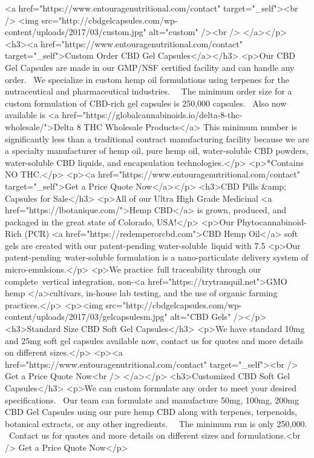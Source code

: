 <a href="https://www.entouragenutritional.com/contact" target="_self"><br />
<img src="http://cbdgelcapsules.com/wp-content/uploads/2017/03/custom.jpg" alt="custom" /><br />
</a></p>
<h3><a href="https://www.entouragenutritional.com/contact" target="_self">Custom Order CBD Gel Capsules</a></h3>
<p>Our CBD Gel Capsules are made in our GMP/NSF certified facility and can handle any order.  We specialize in custom hemp oil formulations using terpenes for the nutraceutical and pharmaceutical industries.   The minimum order size for a custom formulation of CBD-rich gel capsules is 250,000 capsules.  Also now available is <a href="https://globalcannabinoids.io/delta-8-thc-wholesale/">Delta 8 THC Wholesale Products</a> This minimum number is significantly less than a traditional contract manufacturing facility because we are a specialty manufacturer of hemp oil, pure hemp oil, water-soluble CBD powders, water-soluble CBD liquids, and encapsulation technologies.</p>
<p>*Contains NO THC.</p>
<p><a href="https://www.entouragenutritional.com/contact" target="_self">Get a Price Quote Now</a></p>
<h3>CBD Pills &amp; Capsules for Sale</h3>
<p>All of our Ultra High Grade Medicinal <a href="https://lbotanique.com/">Hemp CBD</a> is grown, produced, and packaged in the great state of Colorado, USA!</p>
<p>Our Phytocannabinoid-Rich (PCR) <a href="https://redemperorcbd.com">CBD Hemp Oil</a> soft gels are created with our patent-pending water-soluble liquid with 7.5%
<p>Our patent-pending water-soluble formulation is a nano-particulate delivery system of micro-emulsions.</p>
<p>We practice full traceability through our complete vertical integration, non-<a href="https://trytranquil.net">GMO hemp </a>cultivars, in-house lab testing, and the use of organic farming practices.</p>
<p><img src="http://cbdgelcapsules.com/wp-content/uploads/2017/03/gelcapsulesm.jpg" alt="CBD Gels" /></p>
<h3>Standard Size CBD Soft Gel Capsules</h3>
<p>We have standard 10mg and 25mg soft gel capsules available now, contact us for quotes and more details on different sizes.</p>
<p><a href="https://www.entouragenutritional.com/contact" target="_self"><br />
Get a Price Quote Now<br />
</a></p>
<h3>Customized CBD Soft Gel Capsules</h3>
<p>We can custom formulate any order to meet your desired specifications.  Our team can formulate and manufacture 50mg, 100mg, 200mg CBD Gel Capsules using our pure hemp CBD along with terpenes, terpenoids, botanical extracts, or any other ingredients.   The minimum run is only 250,000.  Contact us for quotes and more details on different sizes and formulations.<br />
Get a Price Quote Now</p>

